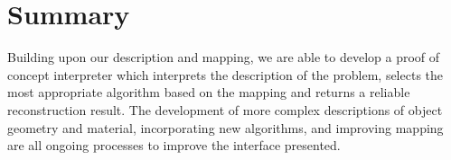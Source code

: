 \section{Summary}
Building upon our description and mapping, we are able to develop a proof of concept interpreter which interprets the description of the problem, selects the most appropriate algorithm based on the mapping and returns a reliable reconstruction result. The development of more complex descriptions of object geometry and material, incorporating new algorithms, and improving mapping are all ongoing processes to improve the interface presented.
